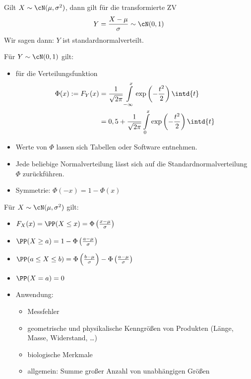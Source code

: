 \documentclass{scrreprt}
\begin{document}
 Gilt $X\sim \cN(\mu, \sigma^2)$, dann gilt für die transformierte ZV
$$Y=\frac{X-\mu}{\sigma} \sim \cN (0,1)$$
Wir sagen dann: $Y$ ist standardnormalverteilt.

 Für $Y \sim \cN (0,1)$ gilt:
\begin{itemize}
\item für die Verteilungsfunktion
\begin{align*}
\Phi(x):=F_Y(x)&=\frac{1}{\sqrt{2\pi}}\int\limits_{-\infty}^x \exp\left(-\frac{t^2}{2}\right)\intd{t}\\
&= 0,5 + \frac{1}{\sqrt{2\pi}}\int\limits_0^x \exp\left(-\frac{t^2}{2}\right)\intd{t}
\end{align*}
\item Werte von $\Phi$ lassen sich Tabellen oder Software entnehmen.
\item Jede beliebige Normalverteilung lässt sich auf die Standardnormalverteilung $\Phi$ zurückführen.
\item Symmetrie: $\Phi(-x)=1-\Phi(x)$
\end{itemize}

 Für $X \sim \cN(\mu, \sigma^2)$ gilt:
\begin{itemize}
\item $F_X(x) = \PP(X\leq x) = \Phi \left(\frac{x-\mu}{\sigma}\right)$
\item $\PP(X\geq a) = 1 - \Phi \left(\frac{a-\mu}{\sigma}\right)$
\item $\PP(a\leq X\leq b)=\Phi \left(\frac{b-\mu}{\sigma}\right)-\Phi \left(\frac{a-\mu}{\sigma}\right)$
\item $\PP(X=a)=0$
\item Anwendung:
\begin{itemize}
\item Messfehler
\item geometrische und physikalische  Kenngrößen von Produkten (Länge, Masse, Widerstand, …)
\item biologische Merkmale
\item allgemein: Summe großer Anzahl von unabhängigen Größen
\end{itemize}
\end{itemize}
\end{document}
